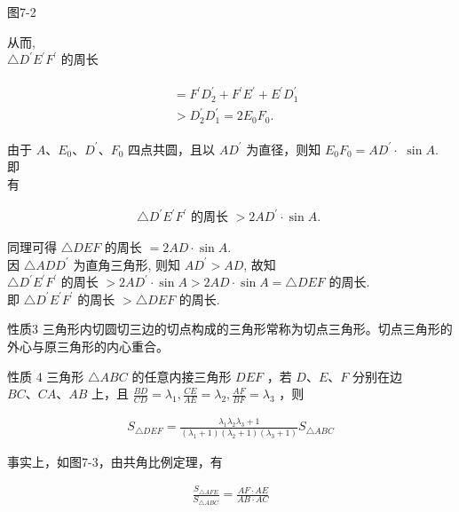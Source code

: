 \documentclass[10pt]{article}
\begin{document}
图7-2

从而,\\
$\triangle D^{\prime} E^{\prime} F^{\prime}$ 的周长

\begin{align*}
\begin{aligned}
& =F^{\prime} D_{2}^{\prime}+F^{\prime} E^{\prime}+E^{\prime} D_{1}^{\prime} \\
& >D_{2}^{\prime} D_{1}^{\prime}=2 E_{0} F_{0} .
\end{aligned}
\end{align*}

由于 $A 、 E_{0} 、 D^{\prime} 、 F_{0}$ 四点共圆，且以 $A D^{\prime}$ 为直径，则知 $E_{0} F_{0}=A D^{\prime} \cdot$ $\sin A$. 即\\
有

\begin{align*}
\triangle D^{\prime} E^{\prime} F^{\prime} \text { 的周长 }>2 A D^{\prime} \cdot \sin A \text {. }
\end{align*}

同理可得 $\triangle D E F$ 的周长 $=2 A D \cdot \sin A$.\\
因 $\triangle A D D^{\prime}$ 为直角三角形, 则知 $A D^{\prime}>A D$, 故知\\
$\triangle D^{\prime} E^{\prime} F^{\prime}$ 的周长 $>2 A D^{\prime} \cdot \sin A>2 A D \cdot \sin A=\triangle D E F$ 的周长.\\
即 $\triangle D^{\prime} E^{\prime} F^{\prime}$ 的周长 $>\triangle D E F$ 的周长.

性质3 三角形内切圆切三边的切点构成的三角形常称为切点三角形。切点三角形的外心与原三角形的内心重合。

性质 4 三角形 $\triangle A B C$ 的任意内接三角形 $D E F$ ，若 $D 、 E 、 F$ 分别在边 $B C 、 C A 、 A B$ 上，且 $\frac{B D}{C D}=\lambda_{1}, \frac{C E}{A E}=\lambda_{2}, \frac{A F}{B F}=\lambda_{3}$ ，则

\begin{align*}
S_{\triangle D E F}=\frac{\lambda_{1} \lambda_{2} \lambda_{3}+1}{\left(\lambda_{1}+1\right)\left(\lambda_{2}+1\right)\left(\lambda_{3}+1\right)} S_{\triangle A B C} \tag{7-1}
\end{align*}

事实上，如图7-3，由共角比例定理，有

\begin{align*}
\frac{S_{\triangle A F E}}{S_{\triangle A B C}}=\frac{A F \cdot A E}{A B \cdot A C}
\end{align*}
\end{document}
